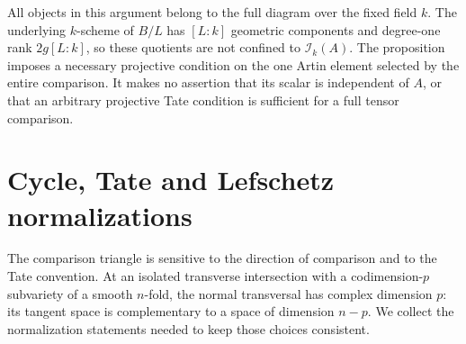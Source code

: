 \documentclass[11pt]{article}
\theoremstyle{definition}\newtheorem{definition}[theorem]{Definition}
\theoremstyle{remark}\newtheorem{remark}[theorem]{Remark}
\begin{document}
All objects in this argument belong to the full diagram over the fixed
field $k$. The underlying $k$-scheme of $B/L$ has $[L:k]$ geometric
components and degree-one rank $2g[L:k]$, so these quotients are not
confined to $\mathcal I_k(A)$. The proposition imposes a necessary
projective condition on the one Artin element selected by the entire
comparison. It makes no assertion that its scalar is independent of
$A$, or that an arbitrary projective Tate condition is sufficient for
a full tensor comparison.

\section{Cycle, Tate and Lefschetz normalizations}\label{sec:normalizations}
The comparison triangle is sensitive to the direction of comparison and to the Tate convention. At an isolated transverse intersection with a codimension-$p$ subvariety of a smooth $n$-fold, the normal transversal has complex dimension $p$: its tangent space is complementary to a space of dimension $n-p$. We collect the normalization statements needed to keep those choices consistent.
\end{document}
